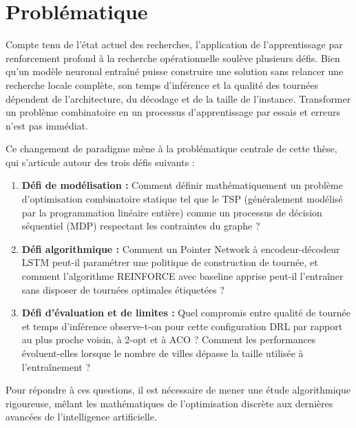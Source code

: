 \documentclass[12pt, a4paper, twoside, openright]{book}
\begin{document}
\section*{Probl\'ematique}

Compte tenu de l'état actuel des recherches, l'application de l'apprentissage par renforcement profond à la recherche opérationnelle soulève plusieurs défis. Bien qu'un modèle neuronal entraîné puisse construire une solution sans relancer une recherche locale complète, son temps d'inférence et la qualité des tournées dépendent de l'architecture, du décodage et de la taille de l'instance. Transformer un problème combinatoire en un processus d'apprentissage par essais et erreurs n'est pas immédiat.

Ce changement de paradigme mène à la problématique centrale de cette thèse, qui s'articule autour des trois défis suivants :

\begin{enumerate}
	\item \textbf{Défi de modélisation :} Comment définir mathématiquement un problème d'optimisation combinatoire statique tel que le TSP (généralement modélisé par la programmation linéaire entière) comme un processus de décision séquentiel (MDP) respectant les contraintes du graphe ?
	\item \textbf{Défi algorithmique :} Comment un Pointer Network à encodeur-décodeur LSTM peut-il paramétrer une politique de construction de tournée, et comment l'algorithme REINFORCE avec baseline apprise peut-il l'entraîner sans disposer de tournées optimales étiquetées ?
	\item \textbf{Défi d'évaluation et de limites :} Quel compromis entre qualité de tournée et temps d'inférence observe-t-on pour cette configuration DRL par rapport au plus proche voisin, à 2-opt et à ACO ? Comment les performances évoluent-elles lorsque le nombre de villes dépasse la taille utilisée à l'entraînement ?
\end{enumerate}

Pour répondre à ces questions, il est nécessaire de mener une étude algorithmique rigoureuse, mêlant les mathématiques de l'optimisation discrète aux dernières avancées de l'intelligence artificielle.
	
\end{document}
